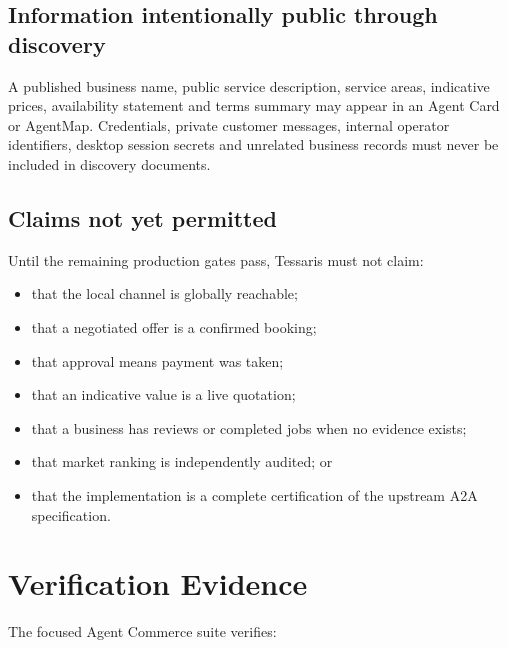 \documentclass[11pt,a4paper]{article}
\begin{document}
\subsection{Information intentionally public through discovery}

A published business name, public service description, service areas,
indicative prices, availability statement and terms summary may appear in an
Agent Card or AgentMap.  Credentials, private customer messages, internal
operator identifiers, desktop session secrets and unrelated business records
must never be included in discovery documents.

\subsection{Claims not yet permitted}

Until the remaining production gates pass, Tessaris must not claim:

\begin{itemize}
  \item that the local channel is globally reachable;
  \item that a negotiated offer is a confirmed booking;
  \item that approval means payment was taken;
  \item that an indicative value is a live quotation;
  \item that a business has reviews or completed jobs when no evidence exists;
  \item that market ranking is independently audited; or
  \item that the implementation is a complete certification of the upstream
        A2A specification.
\end{itemize}

\section{Verification Evidence}

The focused Agent Commerce suite verifies:
\end{document}

